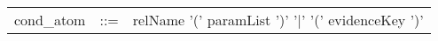 %
\begin{tabular}{lcl}
cond\_atom &::=& relName '(' paramList ')' '|' '(' evidenceKey ')'\\
\end{tabular}
